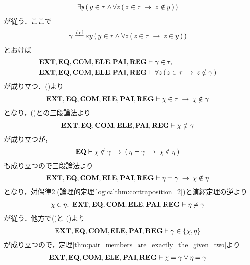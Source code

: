\begin{sketch}
\begin{align}
			\exists y\, (\, y \in \tau \wedge \forall z\, (\, z \in \tau 
			\hspace{0.25em}\rightarrow\hspace{0.25em} z \notin y\, )\, )
		\end{align}
		が従う．ここで
		\begin{align}
			\gamma \defeq \varepsilon y\, (\, y \in \tau \wedge \forall z\, (\, z \in \tau \rarrow z \in y\, )\, )
		\end{align}
		とおけば
		\begin{align}
			\mbox{{\bf EXT}},\mbox{{\bf EQ}},\mbox{\bf COM},\mbox{{\bf ELE}},\mbox{{\bf PAI}},\mbox{{\bf REG}} &\vdash \gamma \in \tau, 
			\label{fom:no_pair_of_sets_go_round_4} \\
			\mbox{{\bf EXT}},\mbox{{\bf EQ}},\mbox{\bf COM},\mbox{{\bf ELE}},\mbox{{\bf PAI}},\mbox{{\bf REG}} &\vdash \forall z\, (\, z \in \tau \hspace{0.25em}\rightarrow\hspace{0.25em} z \notin \gamma\, )
			\label{fom:no_pair_of_sets_go_round_5}
		\end{align}
		が成り立つ．()より
		\begin{align}
			\mbox{{\bf EXT}},\mbox{{\bf EQ}},\mbox{\bf COM},\mbox{{\bf ELE}},\mbox{{\bf PAI}},\mbox{{\bf REG}} \vdash 
			\chi \in \tau \hspace{0.25em}\rightarrow\hspace{0.25em} \chi \notin \gamma
		\end{align}
		となり，()との三段論法より
		\begin{align}
			\mbox{{\bf EXT}},\mbox{{\bf EQ}},\mbox{\bf COM},\mbox{{\bf ELE}},\mbox{{\bf PAI}},\mbox{{\bf REG}} \vdash \chi \notin \gamma
			\label{fom:no_pair_of_sets_go_round_8}
		\end{align}
		が成り立つが，
		\begin{align}
			\mbox{{\bf EQ}} \vdash \chi \notin \gamma \hspace{0.25em}\rightarrow\hspace{0.25em} 
			(\, \eta = \gamma \hspace{0.25em}\rightarrow\hspace{0.25em} \chi \notin \eta\, )
		\end{align}
		も成り立つので三段論法より
		\begin{align}
			\mbox{{\bf EXT}},\mbox{{\bf EQ}},\mbox{\bf COM},\mbox{{\bf ELE}},\mbox{{\bf PAI}},\mbox{{\bf REG}} \vdash 
			\eta = \gamma \hspace{0.25em}\rightarrow\hspace{0.25em} \chi \notin \eta
		\end{align}
		となり，対偶律2 (論理的定理\ref{logicalthm:contraposition_2})と演繹定理の逆より
		\begin{align}
			\chi \in \eta,\ \mbox{{\bf EXT}},\mbox{{\bf EQ}},\mbox{\bf COM},\mbox{{\bf ELE}},\mbox{{\bf PAI}},\mbox{{\bf REG}} \vdash 
			\eta \neq \gamma
			\label{fom:no_pair_of_sets_go_round_7}
		\end{align}
		が従う．他方で()と
		()より
		\begin{align}
			\mbox{{\bf EXT}},\mbox{{\bf EQ}},\mbox{\bf COM},\mbox{{\bf ELE}},\mbox{{\bf PAI}},\mbox{{\bf REG}} \vdash \gamma \in \{\chi,\eta\}
		\end{align}
		が成り立つので，定理\ref{thm:pair_members_are_exactly_the_given_two}より
		\begin{align}
			\EXTAX,\EQAX,\COMAX,\ELEAX,\PAIAX,\REGAX \vdash \chi = \gamma \vee \eta = \gamma

\end{align}
\end{sketch}
